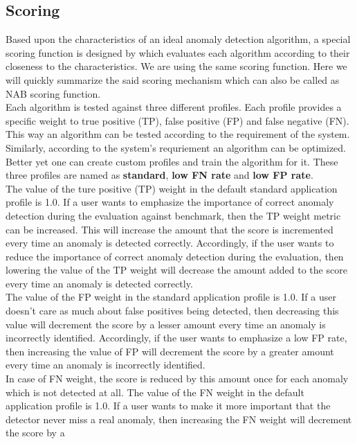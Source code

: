 \documentclass[12pt]{article}
\begin{document}
\subsection{Scoring}
Based upon the characteristics of an ideal anomaly detection algorithm, a special scoring function is designed by \cite{DBLP:journals/corr/LavinA15} which evaluates each algorithm according to their closeness to the characteristics. We are using the same scoring function. Here we will quickly summarize the said scoring mechanism which can also be called as NAB scoring function. \\
\break
Each algorithm is tested against three different profiles. Each profile provides a specific weight to true positive (TP), false positive (FP) and false negative (FN). This way an algorithm can be tested according to the requirement of the system. Similarly, according to the system's requriement an algorithm can be optimized. Better yet one can create custom profiles and train the algorithm for it. These three profiles are named as \textbf{standard}, \textbf{low FN rate} and \textbf{low FP rate}.\\
\break
The value of the ture positive (TP) weight in the default standard application profile is 1.0. If a user wants to emphasize the importance of correct anomaly detection during the evaluation against benchmark, then the TP weight metric can be increased. This will increase the amount that the score is incremented every time an anomaly is detected correctly. Accordingly, if the user wants to reduce the importance of correct anomaly detection during the evaluation, then lowering the value of the TP weight will decrease the amount added to the score every time an anomaly is detected correctly.\\
\break
The value of the FP weight in the standard application profile is 1.0. If a user doesn’t care as much about false positives being detected, then decreasing this value will decrement the score by a lesser amount every time an anomaly is incorrectly identified. Accordingly, if the user wants to emphasize a low FP rate, then increasing the value of FP will decrement the score by a greater amount every time an anomaly is incorrectly identified.\\
\break
In case of FN weight, the score is reduced by this amount once for each anomaly
which is not detected at all. The value of the FN weight in the default application
profile is 1.0. If a user wants to make it more important that the detector never
miss a real anomaly, then increasing the FN weight will decrement the score by a
\end{document}
